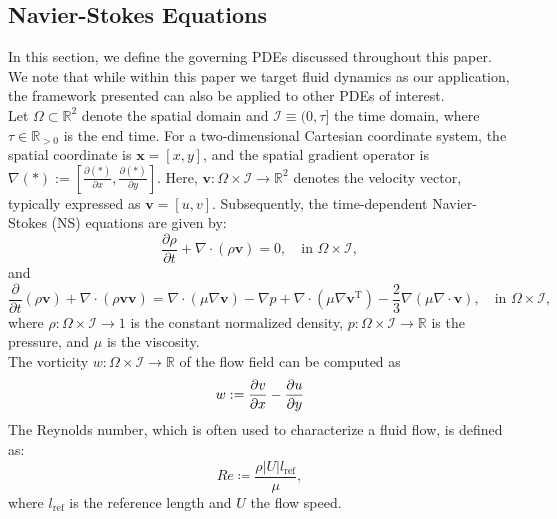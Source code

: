 \documentclass{article}
\begin{document}
\subsection{Navier-Stokes Equations}
\label{sec:nse}
In this section, we define the governing PDEs discussed throughout this paper. We note that while within this paper we target fluid dynamics as our application, the framework presented can also be applied to other PDEs of interest. \\
Let \(\Omega \subset \mathbb{R}^2\) denote the spatial domain and \(\mathcal{I} \equiv (0, \tau]\) the time domain, where \(\tau \in \mathbb{R}_{>0}\) is the end time. For a two-dimensional Cartesian coordinate system, the spatial coordinate is \(\mathbf{x} = [x, y]\), and the spatial gradient operator is \(\nabla(*) := \left[\frac{\partial(*)}{\partial x}, \frac{\partial(*)}{\partial y}\right]\). Here, \(\mathbf{v} : \Omega \times \mathcal{I} \to \mathbb{R}^2\) denotes the velocity vector, typically expressed as \(\mathbf{v} = [u, v]\). Subsequently, the time-dependent Navier-Stokes (NS) equations are given by:
\begin{equation}
    \frac{\partial \rho}{\partial t} + \nabla \cdot \left( \rho \mathbf{v} \right) = 0, \quad \text{in } \Omega \times \mathcal{I},
    \label{eqn:continuity}
\end{equation}
and
\begin{equation}
    \frac{\partial }{\partial t} \left( \rho \mathbf{v} \right) + \nabla \cdot \left( \rho \mathbf{vv} \right) = \nabla \cdot \left( \mu \nabla \mathbf{v} \right) - \nabla p + \nabla \cdot \left( \mu \nabla \mathbf{v}^{\text{T}} \right) - \frac{2}{3} \nabla \left( \mu \nabla \cdot \mathbf{v} \right), \quad \text{in } \Omega \times \mathcal{I},
    \label{eqn:momentum}
\end{equation}
where \(\rho : \Omega \times \mathcal{I} \to 1\) is the constant normalized density, \(p : \Omega \times \mathcal{I} \to \mathbb{R}\) is the pressure, and \(\mu\) is the viscosity.\\
The vorticity \(w : \Omega \times \mathcal{I} \to \mathbb{R}\) of the flow field can be computed as
\begin{equation}
    w := \frac{\partial v}{\partial x} - \frac{\partial u}{\partial y}
\end{equation}
The Reynolds number, which is often used to characterize a fluid flow, is defined as: 
\begin{equation}
Re \coloneqq \frac{\rho |U| l_\mathrm{ref}}{\mu},
\end{equation}
where \(l_\mathrm{ref}\) is the reference length and $U$ the flow speed.
\end{document}
